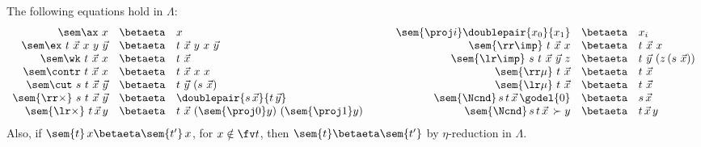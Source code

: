  \begin{lemma} \label{lem:rewriting-into-beta}The following equations hold in $\Lambda$:
    \[
\begin{array}{rcl}
 \sem \ax \  x   &\betaeta  & x \\
 \sem\ex \ t \ \vec x \ x \ y \ \vec y&\betaeta& t\  \vec x  \ y \ x \ \vec y  \\
 \sem\wk \ t \  \vec x\  x     & \betaeta & t\  \vec x\\
 \sem\contr \ t \ \vec x\ x &\betaeta&  t \ \vec x \ x \ x \\
 \sem\cut \ s \ t \ \vec x \ \vec y &\betaeta& t \ \vec y \ (s \ \vec x)\\
{ \sem{ \rr \times} \ s \ t \ \vec x \ \vec y }&\betaeta& \doublepair {  s\, \vec x}{t\,  \vec  y}
\\
  \sem{\lr \times} \ t \, \vec x  \,y & \betaeta &  t\ \vec x \ (\sem{\proj 0} y)\ (\sem{\proj 1} y )
\end{array}
\qquad
\begin{array}{rcl}
 \sem{\proj i }\doublepair {x_0} {x_1} & \betaeta & x_i \\
      \sem{ \rr \imp} \ t  \ \vec x \ x  &\betaeta&  t  \ \vec x \ x \\ 
 \sem{\lr \imp} \ s \ t  \ \vec x\ \vec y \ z  &\betaeta& t \ \vec y \ (z  \, (s \ \vec x )) \\
 \sem{ \rr \mu} \ t \ \vec x &\betaeta&  t \ \vec x \\
  \sem{ \lr \mu} \ t \ \vec x &\betaeta&  t \ \vec x \\
  \sem{ \Ncnd}\, s\, t\, \vec x\, \godel{0} &\betaeta& s\, \vec x \\
      \sem{   \Ncnd} \, s\, t\, \vec x\, \succ y &\betaeta&  t\, \vec x\, y
\end{array}
\]
Also, if $\sem{t}\, x \betaeta \sem{t'}\, x$, for $x\notin \fv t$, then $\sem{t}\betaeta \sem{t'}$ by $\eta$-reduction in $\Lambda$.
\end{lemma}


